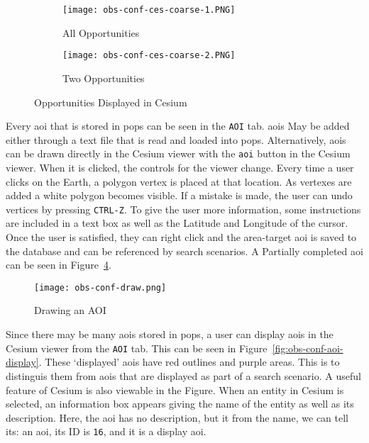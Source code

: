 \begin{figure}[h] 
    \centering
    \begin{subfigure}[b]{0.49\textwidth}
	\texttt{[image: obs-conf-ces-coarse-1.PNG]} 
	\caption{All Opportunities}
	\label{fig:obs-conf-opps-1} 
    \end{subfigure}
    \hfill
    \begin{subfigure}[b]{0.49\textwidth}
	\texttt{[image: obs-conf-ces-coarse-2.PNG]} 
	\caption{Two Opportunities}
	\label{fig:obs-conf-opps-2} 
    \end{subfigure}
    \caption{Opportunities Displayed in Cesium}
    \label{fig:obs-conf-opps} 
\end{figure}

Every \gls{aoi} that is stored in \gls{pops} can be seen in the \texttt{AOI}
tab. \glspl{aoi} May be added either through a text file that is read and
loaded into \gls{pops}. Alternatively, \glspl{aoi} can be drawn directly in the
Cesium viewer with the \texttt{aoi} button in the Cesium viewer. When it is
clicked, the controls for the viewer change. Every time a user clicks on the
Earth, a polygon vertex is placed at that location. As vertexes are added a
white polygon becomes visible. If a mistake is made, the user can undo vertices
by pressing \texttt{CTRL-Z}. To give the user more information, some
instructions are included in a text box as well as the Latitude and Longitude
of the cursor.  Once the user is satisfied, they can right click and the
area-target \gls{aoi} is saved to the database and can be referenced by search
scenarios. A Partially completed \gls{aoi} can be seen in
Figure~\ref{fig:obs-conf-draw}. 

\begin{figure}[h]
    \centering
    \texttt{[image: obs-conf-draw.png]} 
    \caption{Drawing an AOI}
    \label{fig:obs-conf-draw} 
\end{figure}

Since there may be many \glspl{aoi} stored in \gls{pops}, a user can display
\glspl{aoi} in the Cesium viewer from the \texttt{AOI} tab. This can be seen in
Figure~\ref{fig:obs-conf-aoi-display}. These `displayed' \glspl{aoi} have red
outlines and purple areas. This is to distinguis them from \glspl{aoi} that are
displayed as part of a search scenario. A useful feature of Cesium is also
viewable in the Figure. When an entity in Cesium is selected, an information
box appears giving the name of the entity as well as its description. Here, the
\gls{aoi} has no description, but it from the name, we can tell its: an
\gls{aoi}, its ID is \texttt{16}, and it is a display \gls{aoi}.

